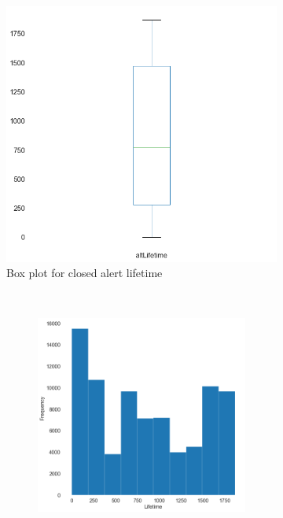 \begin{figure}[h]
	\begin{subfigure}{1\textwidth}
		\centering
		\includegraphics[scale=0.3]{./src/data_analysis/alert_lifetime_box.png}
		\caption{Box plot for closed alert lifetime}
	\end{subfigure}\\
	\begin{subfigure}{1\textwidth}
		\begin{subfigure}{.5\textwidth}
			\centering
			\includegraphics[scale=0.3]{./src/data_analysis/alert_lifetime_hist.png}

\end{subfigure}
\end{subfigure}
\end{figure}
